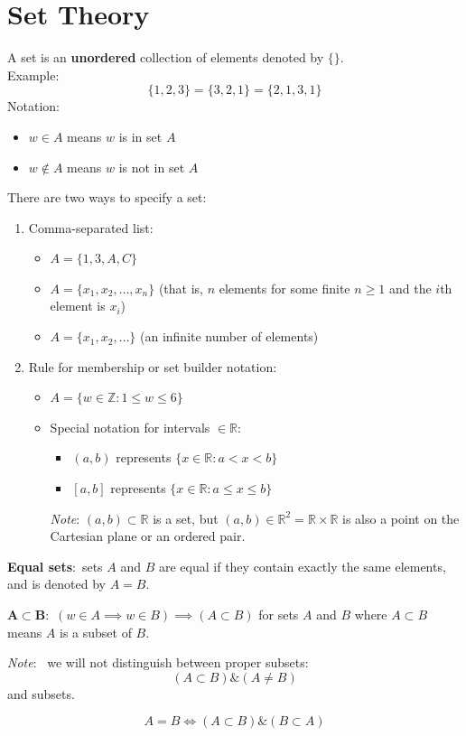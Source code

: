 \documentclass[nobib]{tufte-handout}
\newcommand{\defn}[2]{
        \begin{defbox}
        \noindent\textbf{#1}:\ #2
        \end{defbox}
}
\newcommand{\note}[1]{
        \begin{notebox}
        \noindent\textit{Note}:\ #1
        \end{notebox}
}
\begin{document}
\section{Set Theory}
A set is an \textbf{unordered} collection of elements denoted by $\{ \}$.\\
Example:
\begin{equation*}
    \{1,2,3\} = \{3,2,1\} = \{2,1,3,1\}
\end{equation*}
Notation:
\begin{itemize}
    \item $w \in A$ means $w$ is in set $A$
    \item $w \not\in A$ means $w$ is not in set $A$
\end{itemize}
There are two ways to specify a set:
\begin{enumerate}
    \item Comma-separated list:
          \begin{itemize}
              \item $A = \{1,3,A,C\}$
              \item $A = \{ x_1, x_2, \ldots, x_n\}$ (that is, $n$ elements for some finite $n \geq 1$ and the $i$th element is $x_i$)
              \item $A = \{x_1,x_2, \ldots\}$ (an infinite number of elements)
          \end{itemize}
    \item  Rule for membership or set builder notation:
          \begin{itemize}
              \item $A = \{w \in \mathbb{Z} : 1\leq w \leq 6\}$
              \item Special notation for intervals $\in \mathbb{R}$:
                    \begin{itemize}
                        \item $(a,b)$ represents $\{x \in \mathbb{R}: a < x < b\}$
                        \item $[a,b]$ represents $\{x \in \mathbb{R}: a \leq x \leq b\}$
                    \end{itemize}
                    \textit{Note}: $(a,b) \subset \mathbb{R}$ is a set, but $(a,b) \in \mathbb{R}^2 = \mathbb{R} \times \mathbb{R}$ is also a point on the Cartesian plane or an ordered pair.
          \end{itemize}
\end{enumerate}
\defn{Equal sets}{sets $A$ and $B$ are equal if they contain exactly the same elements, and is denoted by $A=B$.}
\defn{$\mathbf{A \subset B}$}{$(w\in A \implies w\in B)\implies (A \subset B)$ for sets $A$ and $B$ where $A \subset B$ means $A$ is a subset of $B$.}
\note{ we will not distinguish between proper subsets:
    \begin{equation*}
        (A\subset B) \&( A \neq B)
    \end{equation*}
    and subsets.}
\begin{equation*}
    A = B \iff (A \subset B) \& (B \subset A)
\end{equation*}
\end{document}
